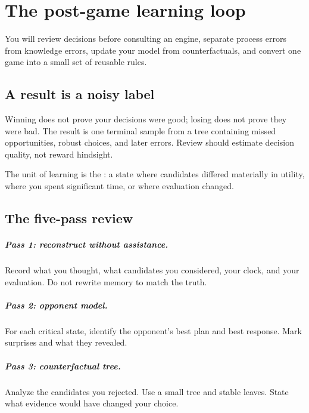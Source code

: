 \chapter{The post-game learning loop}
\begin{learningbox}
You will review decisions before consulting an engine, separate process errors from knowledge errors, update your model from counterfactuals, and convert one game into a small set of reusable rules.
\end{learningbox}

\section{A result is a noisy label}
Winning does not prove your decisions were good; losing does not prove they were bad. The result is one terminal sample from a tree containing missed opportunities, robust choices, and later errors. Review should estimate decision quality, not reward hindsight.

The unit of learning is the : a state where candidates differed materially in utility, where you spent significant time, or where evaluation changed.

\section{The five-pass review}
\paragraph{Pass 1: reconstruct without assistance.} Record what you thought, what candidates you considered, your clock, and your evaluation. Do not rewrite memory to match the truth.

\paragraph{Pass 2: opponent model.} For each critical state, identify the opponent's best plan and best response. Mark surprises and what they revealed.

\paragraph{Pass 3: counterfactual tree.} Analyze the candidates you rejected. Use a small tree and stable leaves. State what evidence would have changed your choice.

